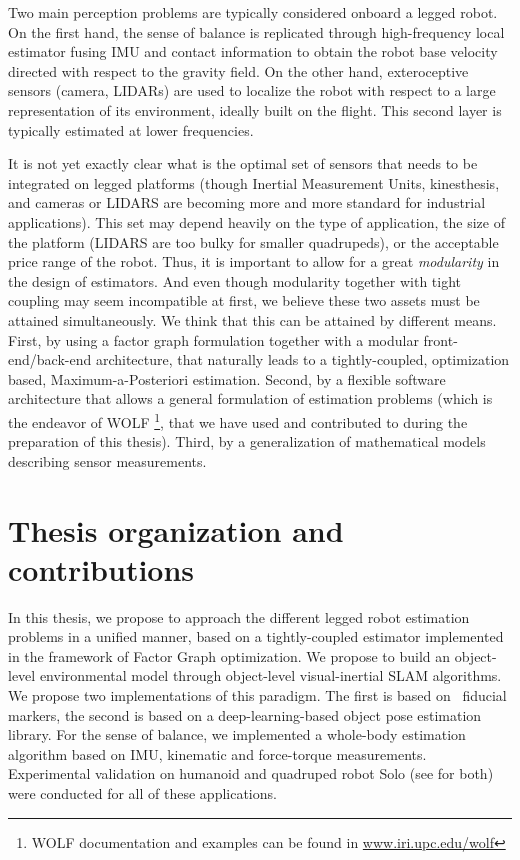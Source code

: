 Two main perception problems are typically considered onboard a legged robot. On the first hand, the sense of balance is replicated through high-frequency
local estimator fusing IMU and contact information to obtain the robot base velocity directed with respect to the gravity field. On the other hand,
exteroceptive sensors (camera, LIDARs) are used to localize the robot with respect to a large representation of its environment, ideally built on the flight.
This second layer is typically estimated at lower frequencies.

It is not yet exactly clear what is the optimal set of sensors that needs to be integrated on legged platforms (though Inertial Measurement Units, kinesthesis, and 
cameras or LIDARS are becoming more and more standard for industrial applications). This set may depend heavily on the type of application,
the size of the platform (LIDARS are too bulky for smaller quadrupeds), or the acceptable price range of the robot. Thus, it is important to allow
for a great \textit{modularity} in the design of estimators.
And even though modularity together with tight coupling may seem incompatible at first, we believe these two assets must be attained simultaneously.
We think that this can be attained by different means. 
First, by using a factor graph formulation together with a modular front-end/back-end architecture, that naturally leads to a tightly-coupled, optimization based, Maximum-a-Posteriori estimation.
Second, by a flexible software architecture
that allows a general formulation of estimation problems (which is the endeavor of WOLF \cite{sola2021wolf} \footnote{WOLF documentation and examples can be 
found in \url{www.iri.upc.edu/wolf}}, that we have used and contributed to during the preparation of this thesis). Third, by a generalization of mathematical
models describing sensor measurements. 
 




\section{Thesis organization and contributions}

In this thesis, we propose to approach the different legged robot estimation problems in a unified manner, based on a tightly-coupled estimator implemented in the framework of Factor Graph optimization.
We propose to build an object-level environmental model through object-level visual-inertial SLAM algorithms. We propose two implementations of this paradigm. 
The first is based on \apriltag\ fiducial markers, the second is based on a deep-learning-based object pose estimation library.   
For the sense of balance, we implemented a whole-body estimation algorithm based on IMU, kinematic and force-torque measurements.
Experimental validation on humanoid  and quadruped robot Solo (see  for both) were conducted for all of these applications.

